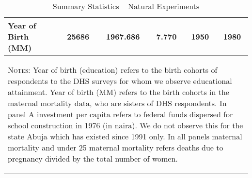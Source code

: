 \begin{subtables}
\begin{table}[htpb!]
\begin{center}
\begin{tabular}{l c c c c c}
Year of Birth (MM)	&	25686	&	1967.686	&	7.770	&	1950	&	1980	\\
\midrule											
\multicolumn{6}{p{12cm}}{\begin{footnotesize}\textsc{Notes:}  Year of birth (education) refers to the birth cohorts of respondents to the DHS surveys for whom we observe educational attainment.  Year of birth (MM) refers to the birth cohorts in the maternal mortality data, who are sisters of DHS respondents.  In panel A investment per capita refers to federal funds dispersed for school construction in 1976 (in naira).  We do not observe this for the state Abuja which has existed since 1991 only.  In all panels maternal mortality and under 25 maternal mortality refers deaths due to pregnancy divided by the total number of women. \end{footnotesize}} \\											
\bottomrule											
\end{tabular}											
\caption{Summary Statistics – Natural Experiments}											
\vspace{-6mm}											
\label{tab:sumstatsexperiment}											
\end{center}											
\end{table}											
\end{subtables}


